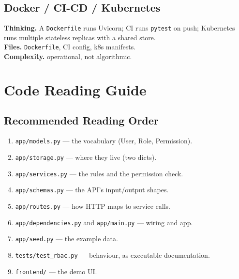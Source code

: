 \documentclass[11pt,a4paper]{report}
\begin{document}
\section{Docker / CI-CD / Kubernetes}
\textbf{Thinking.} A \texttt{Dockerfile} runs Uvicorn; CI runs \texttt{pytest} on
push; Kubernetes runs multiple stateless replicas with a shared store.\\
\textbf{Files.} \texttt{Dockerfile}, CI config, k8s manifests.\\
\textbf{Complexity.} operational, not algorithmic.

\chapter{Code Reading Guide}

\section{Recommended Reading Order}
\begin{enumerate}[leftmargin=1.6em]
  \item \texttt{app/models.py} --- the vocabulary (User, Role, Permission).
  \item \texttt{app/storage.py} --- where they live (two dicts).
  \item \texttt{app/services.py} --- the rules and the permission check.
  \item \texttt{app/schemas.py} --- the API's input/output shapes.
  \item \texttt{app/routes.py} --- how HTTP maps to service calls.
  \item \texttt{app/dependencies.py} and \texttt{app/main.py} --- wiring and app.
  \item \texttt{app/seed.py} --- the example data.
  \item \texttt{tests/test\_rbac.py} --- behaviour, as executable documentation.
  \item \texttt{frontend/} --- the demo UI.
\end{enumerate}
\end{document}

